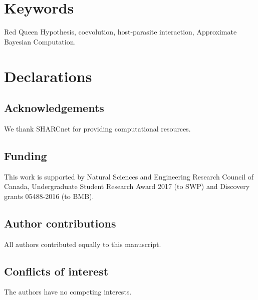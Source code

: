 \documentclass{article}\usepackage[]{graphicx}\usepackage[]{color}
\begin{document}
\section*{Keywords}

Red Queen Hypothesis, coevolution, host-parasite interaction, Approximate Bayesian Computation.

\section*{Declarations}

\subsection*{Acknowledgements}

We thank SHARCnet for providing computational resources.

\subsection*{Funding}

This work is supported by Natural Sciences and Engineering Research Council of Canada, Undergraduate Student Research Award 2017 (to SWP) and Discovery grants 05488-2016 (to BMB).

\subsection*{Author contributions}

All authors contributed equally to this manuscript.

\subsection*{Conflicts of interest}

The authors have no competing interests.
\end{document}

